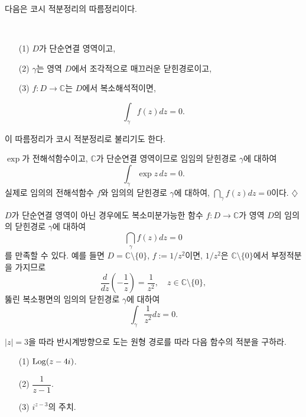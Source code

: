다음은 코시 적분정리의 따름정리이다.

\begin{salt_corollary} \label{coro-3-2}
\
\begin{itemize}
\item[(1)] $D$가 단순연결 영역이고,
\item[(2)] $\gamma$는 영역 $D$에서 조각적으로 매끄러운 닫힌경로이고,
\item[(3)] $f:D\to\mathbb C$는 $D$에서 복소해석적이면,
\end{itemize}
\[
\int_\gamma f(z)dz = 0.
\]
\end{salt_corollary}

이 따름정리가 코시 적분정리로 불리기도 한다.

\begin{saltexample} [label=example-3-9]{}{}
$\exp$가 전해석함수이고, $\mathbb C$가 단순연결 영역이므로
임임의 닫힌경로 $\gamma$에 대하여
\[
\int_\gamma \exp z \, dz = 0.
\]
실제로 임의의 전해석함수 $f$와 임의의 닫힌경로 $\gamma$에 대하여, $\dint_\gamma f(z)dz=0$이다.
\hfill $\diamondsuit$
\end{saltexample}

$D$가 단순연결 영역이 아닌 경우에도 복소미분가능한 함수 $f:D\to \mathbb C$가
영역 $D$의 임의의 닫힌경로 $\gamma$에 대하여
\[
\dint_\gamma f(z)dz=0
\]
를 만족할 수 있다.
예를 들면 $D=\mathbb C\setminus \{0\}$, $f:=1/z^2$이면,
$1/z^2$은 $\mathbb C\setminus \{0\}$에서 부정적분을 가지므로
\[
\dfrac d{dz}\left(- \dfrac 1z\right) = \dfrac1{z^2}, \quad z\in \mathbb C\setminus \{0\},
\]
뚫린 복소평면의 임의의 닫힌경로 $\gamma$에 대하여
\[
\int_\gamma \dfrac 1{z^2}dz=0.
\]

\begin{salt_exercise} \label{ex-3-20}
$|z|=3$을 따라 반시계방향으로 도는 원형 경로를 따라 다음 함수의 적분을 구하라.
\begin{itemize}
\item[(1)] $\mathop{\mathrm{Log}} (z-4i)$.
\item[(2)] $\dfrac1{z-1}$.
\item[(3)] $i^{z-3}$의 주치.
\end{itemize}
\end{salt_exercise}

